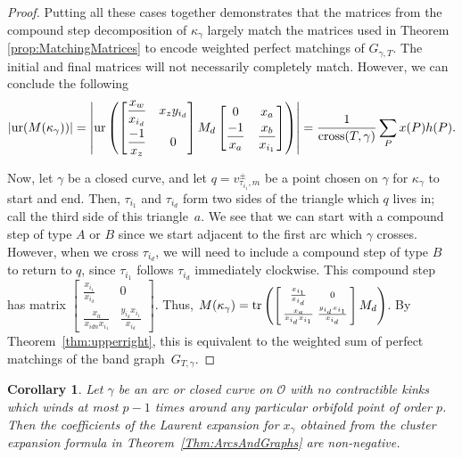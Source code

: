 \documentclass[pdftex]{sigma}%
\newcommand{\ur}{{\rm ur}}
\numberwithin{equation}{section}
\newtheorem{Corollary}[Theorem]{Corollary}
\begin{document}
\begin{proof}
Putting all these cases together demonstrates that the matrices from the compound step decomposition of $\kappa_\gamma$ largely match the matrices used in Theorem \ref{prop:MatchingMatrices} to encode weighted perfect matchings of $G_{\gamma, T}$. The initial and final matrices will not necessarily completely match. However, we can conclude the following \[\vert {\rm ur}(M(\kappa_\gamma)) \vert = \left| \ur\left( \begin{bmatrix} \dfrac{x_w}{x_{i_d}} & x_z y_{i_d} \vspace{1mm}\\ \dfrac{-1}{x_z} & 0 \end{bmatrix} M_d \begin{bmatrix} 0 & x_a \vspace{1mm}\\ \dfrac{-1}{x_a} & \dfrac{x_b}{x_{i_1}} \end{bmatrix} \right) \right| =\frac{1}{{\rm cross}(T,\gamma)} \sum_P x(P) h(P).
\]

Now, let $\gamma$ be a closed curve, and let $q = v_{\tau_{i_1},m}^\pm$ be a point chosen on $\gamma$ for $\kappa_\gamma$ to start and end. Then, $\tau_{i_1}$ and $\tau_{i_d}$ form two sides of the triangle which $q$ lives in; call the third side of this triangle~$a$. We see that we can start with a compound step of type $A$ or $B$ since we start adjacent to the first arc which $\gamma$ crosses. However, when we cross $\tau_{i_d}$, we will need to include a compound step of type $B$ to return to $q$, since $\tau_{i_1}$ follows $\tau_{i_d}$ immediately clockwise. This compound step has matrix $\left[\begin{smallmatrix} \frac{x_{i_1}}{x_{i_d}}& 0 \\ \frac{x_{a}}{x_{idn}x_{i_{1}}} & \frac{y_{i_d}x_{i_1}}{x_{i_d}} \end{smallmatrix}\right]$. Thus, $M(\kappa_\gamma) = {\rm tr}\left(\left[\begin{smallmatrix} \frac{x_{i_1}}{x_{i_d}}& 0 \\ \frac{x_{a}}{x_{i_d}x_{i_{1}}} & \frac{y_{i_d}x_{i_1}}{x_{i_d}} \end{smallmatrix}\right] M_d \right)$. By Theorem~\ref{thm:upperright}, this is equivalent to the weighted sum of perfect matchings of the band graph~$G_{T,\gamma}$.
\end{proof}

\begin{Corollary}
Let $\gamma$ be an arc or closed curve on $\mathcal{O}$ with no contractible kinks which winds at most $p-1$ times around any particular orbifold point of order $p$. Then the coefficients of the Laurent expansion for $x_{\gamma}$ obtained from the cluster expansion formula in Theorem~{\rm \ref{Thm:ArcsAndGraphs}} are non-negative.
\end{Corollary}
\end{document}
